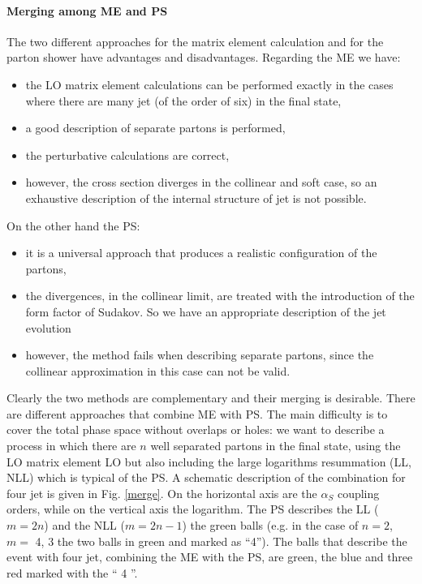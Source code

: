 \paragraph{Merging among ME and PS}
The two different approaches for the  matrix element calculation  and for the parton shower have advantages and disadvantages. Regarding the ME we have:
\begin{itemize}
\item the LO matrix element calculations  can be performed exactly in the cases where there are many jet (of the order of six) in the final state,
\item a good description of separate partons is performed,
\item the perturbative calculations are correct,
\item however, the cross section diverges in the collinear and soft case, so an exhaustive description of the internal structure of jet is not possible.
\end{itemize}
On the other hand the PS:
\begin{itemize}
\item it is a universal approach that produces a realistic configuration of the partons,
\item the divergences, in the collinear limit, are treated with the introduction of the form factor of Sudakov. So we have an appropriate description of the jet evolution
\item however, the method fails when describing separate partons, since the collinear approximation in this case can not be valid.
\end{itemize}
Clearly the two methods are complementary and their merging is desirable. 
There are different approaches that combine ME with PS. The main difficulty is to cover the total phase space without overlaps or holes: we want to describe a process in which there are $ n $ well separated partons in the final state, using the LO matrix element LO but  also including the  large logarithms resummation (LL, NLL) which is typical of the PS. A schematic description of the combination for four jet is given in Fig. \ref{merge}.
On the horizontal axis are the $ \alpha_S $ coupling orders, while on the vertical axis  the logarithm.
The PS describes the LL ($ m = 2n $) and the NLL ($ m = 2n-1 $) the green balls (e.g. in the case of $ n = 2 $, $ m = $ 4, 3 the two balls  in green and marked as ``4'').
The balls that describe the event with four jet, combining the ME with the PS, are  green, the blue  and  three red  marked with the `` 4 ''.
